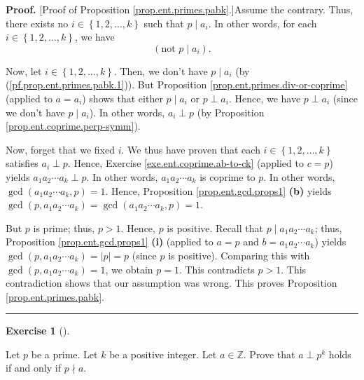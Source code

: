 \documentclass[numbers=enddot,12pt,final,onecolumn,notitlepage]{scrartcl}%
\newcounter{exer}
\numberwithin{exer}{subsection}
\theoremstyle{definition}
\newtheorem{exmp}[exer]{Exercise}
\newenvironment{exercise}[1][]
{\begin{exmp}[#1]\begin{leftbar}}
{\end{leftbar}\end{exmp}}
\newenvironment{fineprint}{\begin{small}}{\end{small}}
\newenvironment{proof}[1][Proof]{\noindent\textbf{#1.} }{\ \rule{0.5em}{0.5em}}
\begin{document}
\begin{fineprint}
\begin{proof}
[Proof of Proposition \ref{prop.ent.primes.pabk}.]Assume the contrary. Thus,
there exists no $i\in\left\{  1,2,\ldots,k\right\}  $ such that $p\mid a_{i}$.
In other words, for each $i\in\left\{  1,2,\ldots,k\right\}  $, we have%
\begin{equation}
\left(  \text{not }p\mid a_{i}\right)  . \label{pf.prop.ent.primes.pabk.1}%
\end{equation}


Now, let $i\in\left\{  1,2,\ldots,k\right\}  $. Then, we don't have $p\mid
a_{i}$ (by (\ref{pf.prop.ent.primes.pabk.1})). But Proposition
\ref{prop.ent.primes.div-or-coprime} (applied to $a=a_{i}$) shows that either
$p\mid a_{i}$ or $p\perp a_{i}$. Hence, we have $p\perp a_{i}$ (since we don't
have $p\mid a_{i}$). In other words, $a_{i}\perp p$ (by Proposition
\ref{prop.ent.coprime.perp-symm}).

Now, forget that we fixed $i$. We thus have proven that each $i\in\left\{
1,2,\ldots,k\right\}  $ satisfies $a_{i}\perp p$. Hence, Exercise
\ref{exe.ent.coprime.ab-to-ck} (applied to $c=p$) yields $a_{1}a_{2}\cdots
a_{k}\perp p$. In other words, $a_{1}a_{2}\cdots a_{k}$ is coprime to $p$. In
other words, $\gcd\left(  a_{1}a_{2}\cdots a_{k},p\right)  =1$. Hence,
Proposition \ref{prop.ent.gcd.props1} \textbf{(b)} yields $\gcd\left(
p,a_{1}a_{2}\cdots a_{k}\right)  =\gcd\left(  a_{1}a_{2}\cdots a_{k},p\right)
=1$.

But $p$ is prime; thus, $p>1$. Hence, $p$ is positive. Recall that $p\mid
a_{1}a_{2}\cdots a_{k}$; thus, Proposition \ref{prop.ent.gcd.props1}
\textbf{(i)} (applied to $a=p$ and $b=a_{1}a_{2}\cdots a_{k}$) yields
$\gcd\left(  p,a_{1}a_{2}\cdots a_{k}\right)  =\left\vert p\right\vert =p$
(since $p$ is positive). Comparing this with $\gcd\left(  p,a_{1}a_{2}\cdots
a_{k}\right)  =1$, we obtain $p=1$. This contradicts $p>1$. This contradiction
shows that our assumption was wrong. This proves Proposition
\ref{prop.ent.primes.pabk}.
\end{proof}
\end{fineprint}

\begin{exercise}
\label{exe.ent.primes.coprime-to-pk}Let $p$ be a prime. Let $k$ be a positive
integer. Let $a\in\mathbb{Z}$. Prove that $a\perp p^{k}$ holds if and only if
$p\nmid a$.
\end{exercise}
\end{document}
